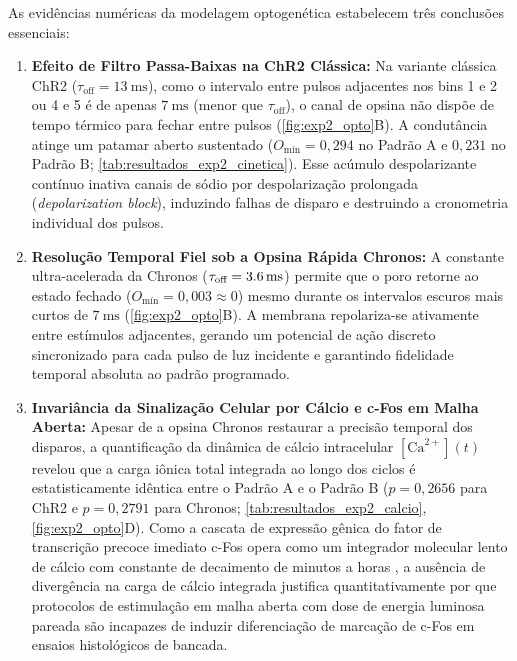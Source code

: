 \documentclass[12pt,openright,oneside,a4paper,brazil]{abntex2}
\begin{document}



As evidências numéricas da modelagem optogenética estabelecem três conclusões essenciais:
\begin{enumerate}
    \item \textbf{Efeito de Filtro Passa-Baixas na ChR2 Clássica:} Na variante clássica ChR2 ($\tau_{\text{off}} = \qty{13}{\milli\second}$), como o intervalo entre pulsos adjacentes nos bins 1 e 2 ou 4 e 5 é de apenas $\qty{7}{\milli\second}$ (menor que $\tau_{\text{off}}$), o canal de opsina não dispõe de tempo térmico para fechar entre pulsos (\cref{fig:exp2_opto}B). A condutância atinge um patamar aberto sustentado ($O_{\text{mín}} = 0{,}294$ no Padrão A e $0{,}231$ no Padrão B; \cref{tab:resultados_exp2_cinetica}). Esse acúmulo despolarizante contínuo inativa canais de sódio por despolarização prolongada (\emph{depolarization block}), induzindo falhas de disparo e destruindo a cronometria individual dos pulsos.
    \item \textbf{Resolução Temporal Fiel sob a Opsina Rápida Chronos:} A constante ultra-acelerada da Chronos ($\tau_{\text{off}} = \qty{3{,}6}{\milli\second}$) permite que o poro retorne ao estado fechado ($O_{\text{mín}} = 0{,}003 \approx 0$) mesmo durante os intervalos escuros mais curtos de $\qty{7}{\milli\second}$ (\cref{fig:exp2_opto}B). A membrana repolariza-se ativamente entre estímulos adjacentes, gerando um potencial de ação discreto sincronizado para cada pulso de luz incidente e garantindo fidelidade temporal absoluta ao padrão programado.
    \item \textbf{Invariância da Sinalização Celular por Cálcio e c-Fos em Malha Aberta:} Apesar de a opsina Chronos restaurar a precisão temporal dos disparos, a quantificação da dinâmica de cálcio intracelular $[\text{Ca}^{2+}](t)$ revelou que a carga iônica total integrada ao longo dos ciclos é estatisticamente idêntica entre o Padrão A e o Padrão B ($p = 0{,}2656$ para ChR2 e $p = 0{,}2791$ para Chronos; \cref{tab:resultados_exp2_calcio}, \cref{fig:exp2_opto}D). Como a cascata de expressão gênica do fator de transcrição precoce imediato c-Fos opera como um integrador molecular lento de cálcio com constante de decaimento de minutos a horas \cite{kandel2021}, a ausência de divergência na carga de cálcio integrada justifica quantitativamente por que protocolos de estimulação em malha aberta com dose de energia luminosa pareada são incapazes de induzir diferenciação de marcação de c-Fos em ensaios histológicos de bancada.
\end{enumerate}
\end{document}
